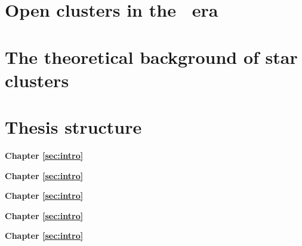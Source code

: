 \section{Open clusters in the \gaia\ era}


\section{The theoretical background of star clusters}


\section{Thesis structure}
\label{sec:intro:structure}

\textbf{Chapter \ref{sec:intro}} \\[0.2em]
\blindtext

\textbf{Chapter \ref{sec:intro}} \\[0.2em]
\blindtext

\textbf{Chapter \ref{sec:intro}} \\[0.2em]
\blindtext

\textbf{Chapter \ref{sec:intro}} \\[0.2em]
\blindtext

\textbf{Chapter \ref{sec:intro}} \\[0.2em]
\blindtext

